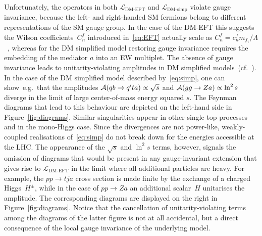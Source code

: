 \documentclass[a4paper, 11pt,notoc]{article}
\begin{document}
Unfortunately, the operators in both $\mathcal{L}_\text{DM-EFT}$ and $\mathcal{L}_\text{DM-simp}$ violate gauge invariance, because the left- and right-handed SM fermions belong to different representations of the SM gauge group. In the case of the DM-EFT this suggests the Wilson coefficients~$C_n^f$ introduced in~\eqref{eq:EFT} actually scale as $C_n^f = c_n^f m_{f_i}/\Lambda$~\cite{Bell:2015sza}, whereas for the DM simplified model restoring gauge invariance requires the embedding of the mediator $a$ into an EW multiplet. The absence of gauge invariance leads to unitarity-violating amplitudes in DM simplified models~(cf.~\cite{Bell:2015sza,Bell:2015rdw,Haisch:2016usn,Englert:2016joy,Maltoni:2001hu,Farina:2012xp}). In the case of the DM simplified model described by~\eqref{eq:simp}, one can show~e.g.~that the amplitudes ${\cal A} ( q b \to q^\prime t a) \propto \sqrt{s}$ and ${\cal A} ( g g \to Z a ) \propto \ln^2 s$ diverge in the limit of large center-of-mass energy squared $s$. The Feynman diagrams that lead to this behaviour are depicted on the left-hand side in Figure~\ref{fig:diagrams}. Similar singularities appear in other single-top processes and in the mono-Higgs case.  Since the divergences are not power-like, weakly-coupled realisations of~\eqref{eq:simp} do not break down for the energies accessible at the LHC. The appearance of the $\sqrt{s}$ and $\ln^2 s$ terms, however, signals the omission of diagrams that would be present in any gauge-invariant extension that gives rise to $\mathcal{L}_\text{DM-EFT}$ in the limit where all additional particles are heavy.   For example, the $pp \to tj a$ cross section is made finite by the exchange of a charged Higgs~$H^\pm$, while in the case of $pp \to Za$  an additional scalar~$H$ unitarises the amplitude. The corresponding diagrams are displayed on the right in Figure~\ref{fig:diagrams}. Notice that the cancellation of unitarity-violating terms among the diagrams of the latter figure is not at all accidental, but a direct consequence of the local gauge invariance of the underlying model.
\end{document}
